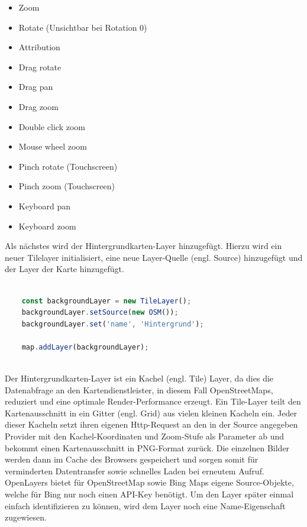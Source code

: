 \begin{itemize}[Controls]
	\item Zoom
	\item Rotate (Unsichtbar bei Rotation 0)
	\item Attribution
\end{itemize}

\begin{itemize}[Interactions]
	\item Drag rotate
	\item Drag pan
	\item Drag zoom
	\item Double click zoom
	\item Mouse wheel zoom
	\item Pinch rotate (Touchscreen)
	\item Pinch zoom (Touchscreen)
	\item Keyboard pan
	\item Keyboard zoom
\end{itemize}

Als nächstes wird der Hintergrundkarten-Layer hinzugefügt.
Hierzu wird ein neuer Tilelayer initialisiert, eine neue Layer-Quelle (engl. Source) hinzugefügt und der Layer der Karte hinzugefügt.

\begin{lstlisting}[language=JavaScript]
	
	const backgroundLayer = new TileLayer();
	backgroundLayer.setSource(new OSM());
	backgroundLayer.set('name', 'Hintergrund');
	
	map.addLayer(backgroundLayer);	
	
\end{lstlisting}

Der Hintergrundkarten-Layer ist ein Kachel (engl. Tile) Layer, da dies die Datenabfrage an den Kartendienstleister, in diesem Fall OpenStreetMaps, reduziert und eine optimale Render-Performance erzeugt.
Ein Tile-Layer teilt den Kartenausschnitt in ein Gitter (engl. Grid) aus vielen kleinen Kacheln ein.
Jeder dieser Kacheln setzt ihren eigenen Http-Request an den in der Source angegeben Provider mit den Kachel-Koordinaten und Zoom-Stufe als Parameter ab und bekommt einen Kartenausschnitt in PNG-Format zurück.
Die einzelnen Bilder werden dann im Cache des Browsers gespeichert und sorgen somit für verminderten Datentransfer sowie schnelles Laden bei erneutem Aufruf.
OpenLayers bietet für OpenStreetMap sowie Bing Maps eigene Source-Objekte, welche für Bing nur noch einen API-Key benötigt.
Um den Layer später einmal einfach identifizieren zu können, wird dem Layer noch eine Name-Eigenschaft zugewiesen.

